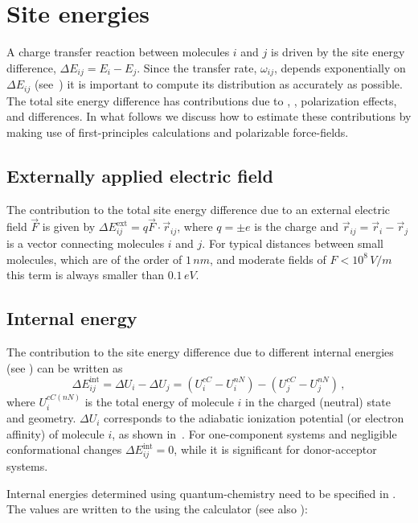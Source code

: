 \section{Site energies}
\label{sec:site_energies}
A charge transfer reaction between molecules $i$ and $j$ is driven by the site energy difference, $\Delta E_{ij} = E_i - E_j$. Since the  transfer rate, $\omega_{ij}$, depends exponentially on $\Delta E_{ij}$ (see~) it is important to compute its distribution as accurately as possible.  The total site energy difference has contributions due to , , polarization effects, and  differences. In what follows we discuss how to estimate these contributions by making use of first-principles calculations and polarizable force-fields.

\subsection{Externally applied electric field}
\label{sec:ext_field}
The contribution to the total site energy difference due to an external electric field $\vec{F}$ is given by $\Delta E_{ij}^\text{ext} = q {\vec{F} \cdot \vec{r}_{ij}}$, where $q=\pm e$ is the charge and $\vec{r}_{ij} = \vec{r}_i  - \vec{r}_j $ is a vector connecting molecules $i$ and $j$. For typical distances between small molecules, which are of the order  of $1\,\unit{nm}$, and moderate fields of $F<10^8\,\unit{V/m}$ this term is always smaller than $0.1\, \unit{eV}$.

\subsection{Internal energy}
\label{sec:internal_energy}

The contribution to the site energy difference due to different internal energies (see ) can be written as
\begin{equation}
 \Delta E_{ij}^\text{int}=
\Delta U_i - \Delta U_j = \left( U_{i}^{cC}-U_{i}^{nN}\right) - \left( U_{j}^{cC}-U_{j}^{nN}\right) \, ,
\label{equ:conformational}
\end{equation}
where $U_{i}^{cC(nN)}$ is the total energy of molecule $i$ in the charged (neutral) state and geometry.  $\Delta U_{i}$ corresponds to the adiabatic ionization potential (or electron affinity) of molecule $i$, as shown in~. For one-component systems and negligible conformational changes $ \Delta E_{ij}^\text{int}=0$, while it is significant for donor-acceptor systems. 

Internal energies determined using quantum-chemistry need to be specified in \xmlcsg. The values are written to the \sqlstate using the calculator  (see also ):
